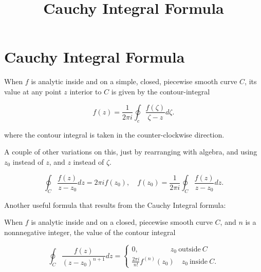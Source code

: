 \documentclass{article}
\title{Cauchy Integral Formula}
\begin{document}
\section{Cauchy Integral Formula}

When $f$ is \@{analytic} inside and on a simple, closed, piecewise \@{smooth} curve $C$, its value at any point $z$ interior to $C$ is given by the \@{contour-integral}

\[ f(z) = \frac{1}{2 \pi i} \oint_c \frac{f(\zeta)}{\zeta - z} d\zeta. \]

where the contour integral is taken in the counter-clockwise direction.

A couple of other variations on this, just by rearranging with algebra, and using $z_0$ instead of $z$, and $z$ instead of $\zeta$.

\[ \oint_C \frac{f(z)}{z - z_0} dz = 2 \pi i f(z_0), \quad f(z_0) = \frac{1}{2 \pi i} \oint_C \frac{f(z)}{z - z_0} dz. \]

Another useful formula that results from the Cauchy Integral formula:

When $f$ is \@{analytic} inside and on a closed, piecewise smooth curve $C$, and $n$ is a nonnnegative integer, the value of the contour integral

\[ \oint_C \frac{f(z)}{(z - z_0)^{n+1}} dz = \begin{cases} 0, \quad \quad \quad \quad ~ ~  z_0 ~ \text{outside} ~ C \\ \frac {2 \pi i}{n!} f^{(n)}(z_0) \quad z_0 ~ \text{inside} ~ C. \end{cases} \]
\end{document}
